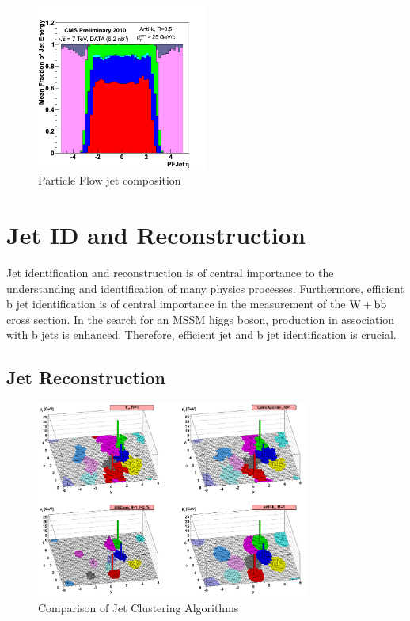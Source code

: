 \begin{figure}[b]
  \centering
	\includegraphics[width=0.5\textwidth]{images/ParticleFlowJet.png}
  	\caption[PF Jet]
   	{Particle Flow jet composition}
	\label{fig:ParticleFlowJet}
\end{figure}

\section{Jet ID and Reconstruction}

Jet identification and reconstruction is of central importance to the understanding
and identification of many physics processes. Furthermore, efficient b jet 
identification is of central importance
in the measurement of the $\mathrm{W+\mathrm{b\bar{b}}}$ cross section.  
In the search for an MSSM higgs boson, production in association with b jets
is enhanced. Therefore, efficient jet and b jet identification is crucial.

\subsection{Jet Reconstruction}
\label{sec:JetReco}
\begin{figure}[ht]
  \centering
	\includegraphics[width=0.8\textwidth]{images/AntiKTAlgo.png}
  	\caption[Comparison of Jet Clustering Algorithms]
   	{Comparison of Jet Clustering Algorithms \cite{Cacciari:2008gp}}
	\label{fig:antiKt}
\end{figure}

